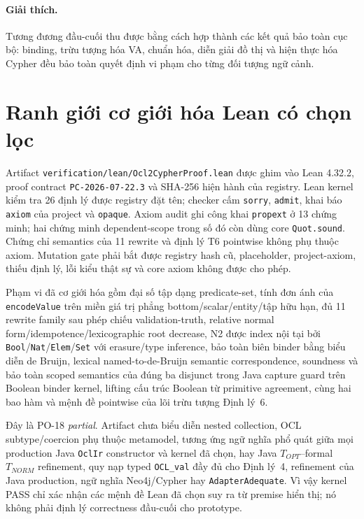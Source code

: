 \documentclass[11pt,a4paper]{article}
\theoremstyle{definition}
\begin{document}
\paragraph{Giải thích.}
Tương đương đầu-cuối thu được bằng cách hợp thành các kết quả bảo toàn cục bộ:
binding, trừu tượng hóa VA, chuẩn hóa, diễn giải đồ thị và hiện thực hóa Cypher
đều bảo toàn quyết định vi phạm cho từng đối tượng ngữ cảnh.

\section{Ranh giới cơ giới hóa Lean có chọn lọc}

Artifact \texttt{verification/lean/Ocl2CypherProof.lean} được ghim
vào Lean 4.32.2, proof contract \texttt{PC-2026-07-22.3} và SHA-256 hiện
hành của registry. Lean kernel kiểm tra 26 định lý được registry đặt
tên; checker cấm \texttt{sorry}, \texttt{admit}, khai báo \texttt{axiom}
của project và \texttt{opaque}. Axiom audit ghi công khai \texttt{propext}
ở 13 chứng minh; hai chứng minh dependent-scope trong số đó còn dùng core
\texttt{Quot.sound}. Chứng chỉ semantics của 11
rewrite và định lý T6 pointwise không phụ thuộc axiom. Mutation gate phải bắt được registry
hash cũ, placeholder, project-axiom, thiếu định lý, lỗi kiểu thật sự và core
axiom không được cho phép.

Phạm vi đã cơ giới hóa gồm đại số tập dạng predicate-set, tính
đơn ánh của \texttt{encodeValue} trên miền giá trị phẳng
bottom/scalar/entity/tập hữu hạn, đủ 11 rewrite family sau phép chiếu
validation-truth, relative normal form/idempotence/lexicographic root decrease,
N2 được index nội tại bởi \texttt{Bool}/\texttt{Nat}/\texttt{Elem}/\texttt{Set}
với erasure/type inference, bảo toàn biên binder bằng biểu diễn de Bruijn,
lexical named-to-de-Bruijn semantic correspondence, soundness và bảo toàn
scoped semantics của đúng ba disjunct trong Java capture guard trên Boolean
binder kernel,
lifting cấu trúc Boolean từ primitive agreement, cùng
hai bao hàm và mệnh đề pointwise của lõi trừu tượng Định lý~6.

Đây là PO-18 \emph{partial}. Artifact chưa biểu diễn nested collection,
OCL subtype/coercion phụ thuộc metamodel, tương ứng ngữ nghĩa phổ quát giữa
mọi production Java \texttt{OclIr} constructor và kernel đã chọn, hay Java
$T_{OPT}$--formal $T_{NORM}$ refinement,
quy nạp typed \texttt{OCL\_val} đầy đủ cho Định
lý~4, refinement của Java production, ngữ nghĩa Neo4j/Cypher hay
\texttt{AdapterAdequate}. Vì vậy kernel PASS chỉ xác nhận các mệnh đề
Lean đã chọn suy ra từ premise hiển thị; nó không phải định lý
correctness đầu-cuối cho prototype.
\end{document}
